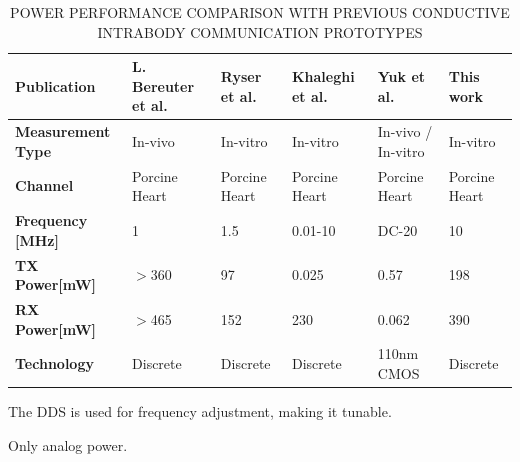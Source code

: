 \documentclass[journal]{IEEEtran}
\begin{document}
\begin{table}[htbp]\caption{POWER PERFORMANCE COMPARISON WITH PREVIOUS CONDUCTIVE INTRABODY COMMUNICATION PROTOTYPES}
    \label{table2}
    \begin{threeparttable}
 \begin{tabularx}{\textwidth}{XXXXXX}
\toprule

\bfseries Publication   & \bfseries L. Bereuter et al.~\cite{bereuter2019leadless} &\bfseries  Ryser et al.~\cite{ryser2022modulation}& \bfseries Khaleghi et al.~\cite{khaleghi2020conductive} & \bfseries Yuk et al.~\cite{yuk2020implantable}  &\bfseries This work\tnote{a}
 \\
\midrule
\bfseries Measurement Type & In-vivo                   & In-vitro           & In-vitro       & In-vivo / In-vitro     & In-vitro  \\
\bfseries Channel          & Porcine Heart             & Porcine Heart      & Porcine Heart  & Porcine Heart & Porcine Heart\\
\bfseries Frequency [MHz]       & 1                        & 1.5               & 0.01-10       &DC-20  & 10   \\
\bfseries TX Power[mW]\tnote{b}
       & $>$360           & 97                 & 0.025     &0.57     & 198        \\
\bfseries RX Power[mW]\tnote{b}
     & $>$465            & 152   & 230   &0.062         & 390      \\
\bfseries Technology       & Discrete                  & Discrete           & Discrete     &110nm CMOS  & Discrete      \\
\bottomrule
\end{tabularx}

 \begin{tablenotes}
        \footnotesize
        \item[a] The DDS is used for frequency adjustment, making it tunable.
        \item[b] Only analog power.

\end{tablenotes}

\end{threeparttable}
\end{table}















\end{document}
